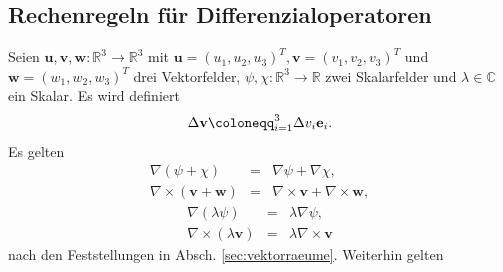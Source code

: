 \documentclass{book}
\let\sum\relax
\DeclareMathOperator*{\sum}{\raisebox{-3.5pt}{\scalebox{2}{\rotatebox{1}{{\bask Σ}}}}}
\begin{document}
\subsection{Rechenregeln für Differenzialoperatoren}
\label{sec:rechenregeln_fuer_differentialoperatoren}

Seien $\mathbf{u}, \mathbf{v}, \mathbf{w}:\mathbb{R}^3\to\mathbb{R}^3$ mit $\mathbf{u} = \left(u_1, u_2, u_3\right)^T, \mathbf{v} = \left(v_1, v_2, v_3\right)^T$ und $\mathbf{w} = \left(w_1, w_2, w_3\right)^T$ drei Vektorfelder, $\psi, \chi:\mathbb{R}^3\to\mathbb{R}$ zwei Skalarfelder und $\lambda\in\mathbb{C}$ ein Skalar. Es wird definiert
%
\begin{eqnarray}
\Delta\mathbf{v} \coloneqq \sum_{i = 1}^{3}\Delta v_i\mathbf{e}_i.
\end{eqnarray}
%
Es gelten
%
\begin{eqnarray}
\nabla\left(\psi + \chi\right) & = & \nabla\psi + \nabla\chi,\\
\nabla\times\left(\mathbf{v} + \mathbf{w}\right) & = & \nabla\times\mathbf{v} + \nabla\times\mathbf{w}, 
\end{eqnarray}
\begin{eqnarray}
\nabla\left(\lambda\psi\right) & = & \lambda\nabla\psi,\\
\nabla\times\left(\lambda\mathbf{v}\right) & = & \lambda\nabla\times\mathbf{v}
\end{eqnarray}
%
nach den Feststellungen in Absch. \ref{sec:vektorraeume}. Weiterhin gelten
%
\end{document}
